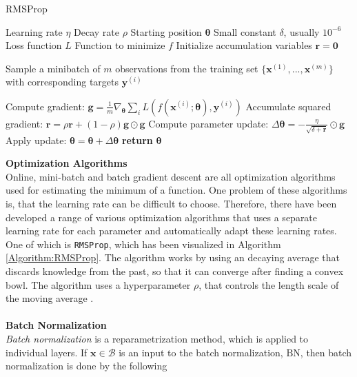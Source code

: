 \documentclass[./main.tex]{subfiles}
\begin{document}
\begin{algorithm}[htbp]
    \caption{RMSProp \cite{DeepLearning}}
    \label{Algorithm:RMSProp}
    \begin{algorithmic}[1]
        \Require Learning rate $\eta$
        \Require Decay rate $\rho$
        \Require Starting position $\bm{\theta}$
        \Require Small constant $\delta$, usually $10^{-6}$
        \Require Loss function $L$
        \Require Function to minimize $f$
        \State Initialize accumulation variables $\bm{r} = \bm{0}$
            \State \begin{varwidth}[t]{\linewidth}
            Sample a minibatch of $m$ observations from the training set $\{\bm{x}^{(1)}, ..., \bm{x}^{(m)}\}$ with corresponding targets $\bm{y}^{(i)}$
            \end{varwidth}
            \State Compute gradient: $\bm{g} = \frac{1}{m} \nabla_{\bm{\theta}} \sum_i L(f(\bm{x}^{(i)}; \bm{\theta}), \bm{y}^{(i)})$
            \State Accumulate squared gradient: $\bm{r} = \rho \bm{r} + (1 - \rho) \bm{g} \odot \bm{g}$
            \State Compute parameter update: $\Delta\bm{\theta} = - \frac{\eta}{\sqrt{\delta + \bm{r}}} \odot \bm{g}$
            \State Apply update: $\bm{\theta} = \bm{\theta} + \Delta \bm{\theta}$ 
        \EndWhile
        \State \textbf{return} $\bm{\theta}$
    \end{algorithmic}
\end{algorithm}
\noindent \textbf{Optimization Algorithms} \\
\noindent Online, mini-batch and batch gradient descent are all optimization algorithms used for estimating the minimum of a function. One problem of these algorithms is, that the learning rate can be difficult to choose. Therefore, there have been developed a range of various optimization algorithms that uses a separate learning rate for each parameter and automatically adapt these learning rates. One of which is \texttt{RMSProp}, which has been visualized in Algorithm \ref{Algorithm:RMSProp}. The algorithm works by using an decaying average that discards knowledge from the past, so that it can converge after finding a convex bowl. The algorithm uses a hyperparameter $\rho$, that controls the length scale of the moving average \cite{DeepLearning}.
\\
\\
\textbf{Batch Normalization} \\
\textit{Batch normalization} is a reparametrization method, which is applied to individual layers. If $\bm{x} \in \mathcal{B}$ is an input to the batch normalization, $\text{BN}$, then batch normalization is done by the following
\end{document}
